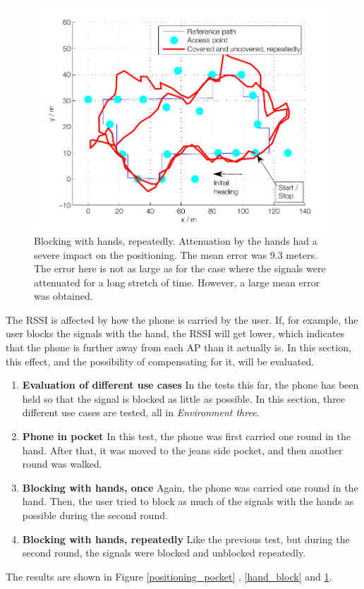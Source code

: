\documentclass{LTHthesis}
\begin{document}
\begin{figure}

\includegraphics[width=1\textwidth ]{images/adapt_parameters/hand_block_repeatedly}
\caption{Blocking with hands, repeatedly. Attenuation by the hands had a severe impact on the positioning. The mean error was 9.3 meters. The error here is not as large as for the case where the signals were attenuated for a long stretch of time. However, a large mean error was obtained. }\label{hand_block_repeatedly}
\end{figure}
%

%
The RSSI is affected by how the phone is carried by the user. If, for example, the user blocks the signals with the hand, the RSSI will get lower, which indicates that the phone is further away from each AP than it actually is. In this section, this effect, and the possibility of compensating for it, will be evaluated.
%
\begin{enumerate}
\item \textbf{Evaluation of different use cases}
In the tests this far, the phone has been held so that the signal is blocked as little as possible. In this section, three different use cases are tested, all in \emph{Environment three}. 

\item \textbf{Phone in pocket}
In this test, the phone was first carried one round in the hand. After that, it was moved to the jeans side pocket, and then another round was walked.

\item \textbf{Blocking with hands, once}
Again, the phone was carried one round in the hand. Then, the user tried to block as much of the signals with the hands as possible during the second round.

\item \textbf{Blocking with hands, repeatedly}
Like the previous test, but during the second round, the signals were blocked and unblocked repeatedly. 
\end{enumerate}
%
The results are shown in Figure \ref{positioning_pocket} , \ref{hand_block} and \ref{hand_block_repeatedly}.
\end{document}
